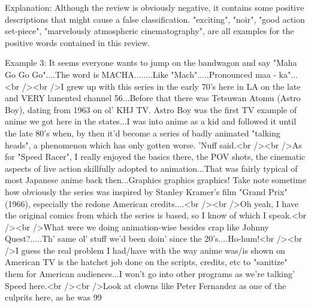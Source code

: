 \begin{simplechar}
Explanation: 
Although the review is obviously negative, it contains some positive descriptions that might cause a false classification.  "exciting", "noir", "good action set-piece", "marvelously atmospheric cinematography", are all examples for the positive words contained in this review.

Example 3:
It seems everyone wants to jump on the bandwagon and say "Maha Go Go Go"....The word is MACHA........Like "Mach".....Pronounced maa - ka"...<br /><br />I grew up with this series in the early 70's here in LA on the late and VERY lamented channel 56...Before that there was Tetsuwan Atomu (Astro Boy), dating from 1963 on ol' KHJ TV. Astro Boy was the first TV example of anime we got here in the states...I was into anime as a kid and followed it until the late 80's when, by then it'd become a series of badly animated "talking heads", a phenomenon which has only gotten worse. 'Nuff said.<br /><br />As for "Speed Racer", I really enjoyed the basics there, the POV shots, the cinematic aspects of live action skillfully adopted to animation...That was fairly typical of most Japanese anime back then...Graphics graphics graphics! Take note sometime how obviously the series was inspired by Stanley Kramer's film "Grand Prix" (1966), especially the redone American credits....<br /><br />Oh yeah, I have the original comics from which the series is based, so I know of which I speak.<br /><br />What were we doing animation-wise besides crap like Johnny Quest?.....Th' same ol' stuff we'd been doin' since the 20's....Ho-hum!<br /><br />I guess the real problem I had/have with the way anime was/is shown on American TV is the hatchet job done on the scripts, credits, etc to "sanitize" them for American audiences...I won't go into other programs as we're talking' Speed here.<br /><br />Look at clowns like Peter Fernandez as one of the culprits here, as he was 99%


\end{simplechar}
